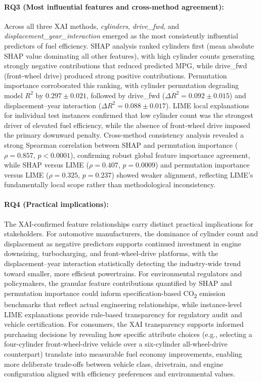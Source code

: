 \paragraph{RQ3 (Most influential features and cross-method agreement):}
Across all three XAI methods, \textit{cylinders}, \textit{drive\_fwd}, and \textit{displacement\_year\_interaction} emerged as the most consistently influential predictors of fuel efficiency. SHAP analysis ranked cylinders first (mean absolute SHAP value dominating all other features), with high cylinder counts generating strongly negative contributions that reduced predicted MPG, while drive\_fwd (front-wheel drive) produced strong positive contributions. Permutation importance corroborated this ranking, with cylinder permutation degrading model \(R^2\) by \(0.297 \pm 0.021\), followed by drive\_fwd (\(\Delta R^2 = 0.092 \pm 0.015\)) and displacement--year interaction (\(\Delta R^2 = 0.088 \pm 0.017\)). LIME local explanations for individual test instances confirmed that low cylinder count was the strongest driver of elevated fuel efficiency, while the absence of front-wheel drive imposed the primary downward penalty. Cross-method consistency analysis revealed a strong Spearman correlation between SHAP and permutation importance (\(\rho = 0.857\), \(p < 0.0001\)), confirming robust global feature importance agreement, while SHAP versus LIME (\(\rho = 0.407\), \(p = 0.0009\)) and permutation importance versus LIME (\(\rho = 0.325\), \(p = 0.237\)) showed weaker alignment, reflecting LIME's fundamentally local scope rather than methodological inconsistency.

\paragraph{RQ4 (Practical implications):}
The XAI-confirmed feature relationships carry distinct practical implications for stakeholders. For automotive manufacturers, the dominance of cylinder count and displacement as negative predictors supports continued investment in engine downsizing, turbocharging, and front-wheel-drive platforms, with the displacement--year interaction statistically detecting the industry-wide trend toward smaller, more efficient powertrains. For environmental regulators and policymakers, the granular feature contributions quantified by SHAP and permutation importance could inform specification-based CO\textsubscript{2} emission benchmarks that reflect actual engineering relationships, while instance-level LIME explanations provide rule-based transparency for regulatory audit and vehicle certification. For consumers, the XAI transparency supports informed purchasing decisions by revealing how specific attribute choices (e.g., selecting a four-cylinder front-wheel-drive vehicle over a six-cylinder all-wheel-drive counterpart) translate into measurable fuel economy improvements, enabling more deliberate trade-offs between vehicle class, drivetrain, and engine configuration aligned with efficiency preferences and environmental values.



